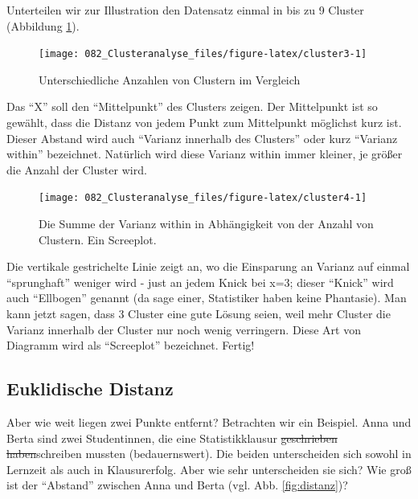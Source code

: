 \documentclass[12pt,ngerman,]{book}
\theoremstyle{definition}
\theoremstyle{definition}
\theoremstyle{remark}
\begin{document}
Unterteilen wir zur Illustration den Datensatz einmal in bis zu 9
Cluster (Abbildung \ref{fig:cluster3}).

\begin{figure}

{\centering \texttt{[image: 082\_Clusteranalyse\_files/figure-latex/cluster3-1]} 

}

\caption{Unterschiedliche Anzahlen von Clustern im Vergleich}\label{fig:cluster3}
\end{figure}

Das ``X'' soll den ``Mittelpunkt'' des Clusters zeigen. Der Mittelpunkt
ist so gewählt, dass die Distanz von jedem Punkt zum Mittelpunkt
möglichst kurz ist. Dieser Abstand wird auch ``Varianz innerhalb des
Clusters'' oder kurz ``Varianz within'' bezeichnet. Natürlich wird diese
Varianz within immer kleiner, je größer die Anzahl der Cluster wird.

\begin{figure}

{\centering \texttt{[image: 082\_Clusteranalyse\_files/figure-latex/cluster4-1]} 

}

\caption{Die Summe der Varianz within in Abhängigkeit von der Anzahl von Clustern. Ein Screeplot.}\label{fig:cluster4}
\end{figure}

Die vertikale gestrichelte Linie zeigt an, wo die Einsparung an Varianz
auf einmal ``sprunghaft'' weniger wird - just an jedem Knick bei x=3;
dieser ``Knick'' wird auch ``Ellbogen'' genannt (da sage einer,
Statistiker haben keine Phantasie). Man kann jetzt sagen, dass 3 Cluster
eine gute Lösung seien, weil mehr Cluster die Varianz innerhalb der
Cluster nur noch wenig verringern. Diese Art von Diagramm wird als
``Screeplot'' bezeichnet. Fertig!

\subsection{Euklidische Distanz}\label{euklidische-distanz}

Aber wie weit liegen zwei Punkte entfernt? Betrachten wir ein Beispiel.
Anna und Berta sind zwei Studentinnen, die eine Statistikklausur
\sout{geschrieben haben}schreiben mussten (bedauernswert). Die beiden
unterscheiden sich sowohl in Lernzeit als auch in Klausurerfolg. Aber
wie sehr unterscheiden sie sich? Wie groß ist der ``Abstand'' zwischen
Anna und Berta (vgl. Abb. \ref{fig:distanz})?
\end{document}
